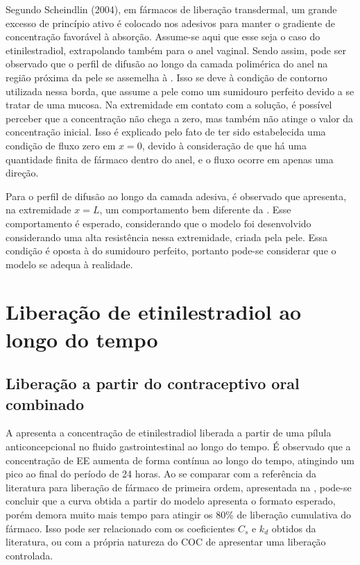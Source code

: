 Segundo Scheindlin (2004), em fármacos de liberação transdermal, um grande excesso de princípio ativo é colocado nos adesivos para manter o gradiente de concentração favorável à absorção. Assume-se aqui que esse seja o caso do etinilestradiol, extrapolando também para o anel vaginal. Sendo assim, pode ser observado que o perfil de difusão ao longo da camada polimérica do anel na região próxima da pele se assemelha à . Isso se deve à condição de contorno utilizada nessa borda, que assume a pele como um sumidouro perfeito devido a se tratar de uma mucosa. Na extremidade em contato com a solução, é possível perceber que a concentração não chega a zero, mas também não atinge o valor da concentração inicial. Isso é explicado pelo fato de ter sido estabelecida uma condição de fluxo zero em $x=0$, devido à consideração de que há uma quantidade finita de fármaco dentro do anel, e o fluxo ocorre em apenas uma direção.

Para o perfil de difusão ao longo da camada adesiva, é observado que apresenta, na extremidade $x = L$, um comportamento bem diferente da . Esse comportamento é esperado, considerando que o modelo foi desenvolvido considerando uma alta resistência nessa extremidade, criada pela pele. Essa condição é oposta à do sumidouro perfeito, portanto pode-se considerar que o modelo se adequa à realidade.

\section{Liberação de etinilestradiol ao longo do tempo}

\subsection{Liberação a partir do contraceptivo oral combinado}

A  apresenta a concentração de etinilestradiol liberada a partir de uma pílula anticoncepcional no fluido gastrointestinal ao longo do tempo. É observado que a concentração de EE aumenta de forma contínua ao longo do tempo, atingindo um pico ao final do período de 24 horas. Ao se comparar com a referência da literatura para liberação de fármaco de primeira ordem, apresentada na , pode-se concluir que a curva obtida a partir do modelo apresenta o formato esperado, porém demora muito mais tempo para atingir os 80\% de liberação cumulativa do fármaco. Isso pode ser relacionado com os coeficientes $C_s$ e $k_d$ obtidos da literatura, ou com a própria natureza do COC de apresentar uma liberação controlada.

